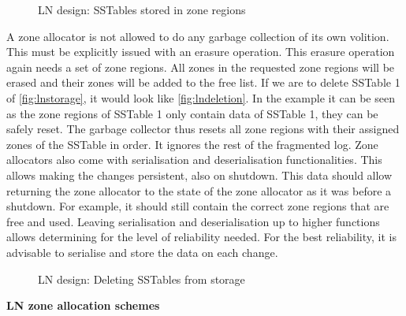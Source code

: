 \begin{figure}[h]
\centering
\begin{minipage}{0.75\textwidth}
  \centering
  
\end{minipage}%
\caption{ LN design: SSTables stored in zone regions }
\label{fig:lnstorage}
\end{figure}

A zone allocator is not allowed to do any garbage collection of its own volition. This must be explicitly issued with an erasure operation. This erasure operation again needs a set of zone regions. All zones in the requested zone regions will be erased and their zones will be added to the free list. If we are to delete SSTable 1 of \autoref{fig:lnstorage}, it would look like \autoref{fig:lndeletion}. In the example it can be seen as the zone regions of SSTable 1 only contain data of SSTable 1, they can be safely reset. The garbage collector thus resets all zone regions with their assigned zones of the SSTable in order. It ignores the rest of the fragmented log. Zone allocators also come with serialisation and deserialisation functionalities. This allows making the changes persistent, also on shutdown. This data should allow returning the zone allocator to the state of the zone allocator as it was before a shutdown. For example, it should still contain the correct zone regions that are free and used. Leaving serialisation and deserialisation up to higher functions allows determining for the level of reliability needed. For the best reliability, it is advisable to serialise and store the data on each change.\\
\begin{figure}[h]
\centering
\begin{minipage}{0.75\textwidth}
  \centering
  
\end{minipage}%
\caption{ LN design: Deleting SSTables from storage }
\label{fig:lndeletion}
\end{figure}
\textbf{LN zone allocation schemes}\\
